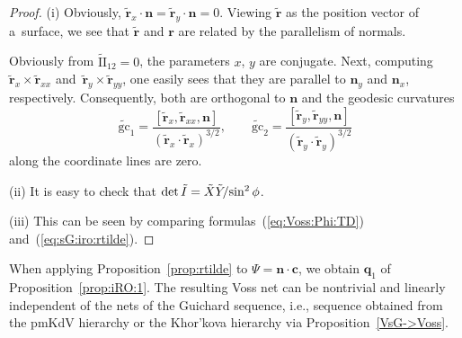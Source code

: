 \documentclass[pdftex]{sigma}
\let\ve\mathbf
\def\eqref#1{{\rm(\ref{#1})}}
\numberwithin{equation}{section}
\theoremstyle{definition}
\begin{document}
\begin{proof}
(i) Obviously,
$
\tilde{\ve r}_x \cdot \ve n = \tilde{\ve r}_y \cdot \ve n = 0.
$
Viewing $\tilde{\ve r}$ as the position vector of a~surface,
we see that $\tilde{\ve r}$ and $\ve r$
are related by the parallelism of normals.

Obviously from $\tilde{\mathrm{II}}_{12} = 0$,
the parameters $x$, $y$ are conjugate.
Next, computing
$\tilde{\ve r}_x \times \tilde{\ve r}_{xx}$ and~${\tilde{\ve r}_y \times \tilde{\ve r}_{yy}}$,
one easily sees that they are
parallel to $\ve n_y$ and $\ve n_x$, respectively.
Consequently, both are orthogonal to $\ve n$ and the geodesic curvatures
\[
\tilde{\mathrm{gc}}_1 = \frac{[\tilde{\ve r}_x, \tilde{\ve r}_{xx}, \ve n]}{(\tilde{\ve r}_x \cdot \tilde{\ve r}_x)^{3/2}},
\qquad
\tilde{\mathrm{gc}}_2 = \frac{[\tilde{\ve r}_y, \tilde{\ve r}_{yy}, \ve n]}{(\tilde{\ve r}_y \cdot \tilde{\ve r}_y)^{3/2}}
\]
along the coordinate lines are zero.

(ii) It is easy to check that
$\det \tilde I = \tilde X \tilde Y\mkern-4mu/{\sin^2\phi}$.

(iii)
This can be seen by comparing formulas~\eqref{eq:Voss:Phi:TD}
and~\eqref{eq:sG:iro:rtilde}.
\end{proof}

When applying Proposition~\ref{prop:rtilde} to $\Psi = \ve n \cdot \ve c$,
we obtain $\ve q_1$ of Proposition~\ref{prop:iRO:1}.
The resulting Voss net can be nontrivial and linearly independent of the
nets of the Guichard sequence, i.e., sequence obtained from the pmKdV
hierarchy or the Khor'kova hierarchy via Proposition~\ref{VsG->Voss}.
\end{document}
